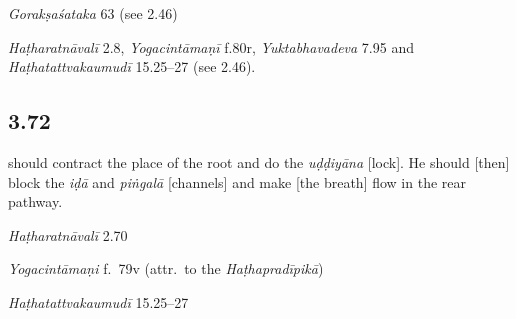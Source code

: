 \begin{ekdosis}
\begin{sources}[hp03_071_1]
\emph{Gorakṣaśataka} 63 (see 2.46)
\end{sources}

\begin{testimonia}[hp03_071_1]
\emph{Haṭharatnāvalī} 2.8, \emph{Yogacintāmaṇī} f.80r, \emph{Yuktabhavadeva} 7.95 and \emph{Haṭhatattvakaumudī} 15.25–27 (see 2.46).

\end{testimonia}



\subsection*{3.72}
\begin{translation} should contract the place of the root  and do the \emph{uḍḍiyāna} [lock]. He should [then] block the \emph{iḍā} and \emph{piṅgalā} [channels] and make [the breath] flow in the rear pathway.
\end{translation}


\begin{testimonia}[hp03_072]
\emph{Haṭharatnāvalī} 2.70
\begin{versinnote}
\end{versinnote}

\emph{Yogacintāmaṇi} f.~79v (attr.~to the \emph{Haṭhapradīpikā})
\begin{versinnote}
\end{versinnote}

\emph{Haṭhatattvakaumudī} 15.25–27
\begin{versinnote}
\end{versinnote}
\end{testimonia}



\end{ekdosis}
